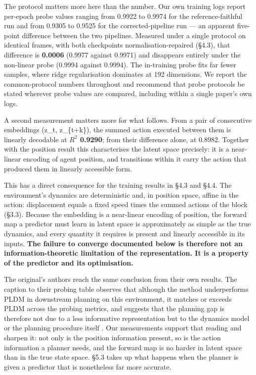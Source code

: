 \documentclass[10pt]{article}
\newcounter{none}
\begin{document}
The protocol matters more here than the number. Our own training logs report
per-epoch probe values ranging from 0.9922 to 0.9974 for the reference-faithful
run and from 0.9305 to 0.9525 for the corrected-pipeline run --- an apparent
five-point difference between the two pipelines. Measured under a single
protocol on identical frames, with both checkpoints normalisation-repaired
(\S{}4.3), that difference is \textbf{0.0006} (0.9977 against 0.9971) and disappears
entirely under the non-linear probe (0.9994 against 0.9994). The in-training
probe fits far fewer samples, where ridge regularisation dominates at 192
dimensions. We report the common-protocol numbers throughout and recommend that
probe protocols be stated wherever probe values are compared, including within a
single paper's own logs.

A second measurement matters more for what follows. From a pair of consecutive
embeddings (z\_t, z\_\{t+k\}), the summed action executed between them is linearly
decodable at \textbf{$R^{2}$ 0.9290}; from their difference alone, at 0.8982. Together
with the position result this characterises the latent space precisely: it is a
near-linear encoding of agent position, and transitions within it carry the
action that produced them in linearly accessible form.

This has a direct consequence for the training results in \S{}4.3 and \S{}4.4. The
environment's dynamics are deterministic and, in position space, affine in the
action: displacement equals a fixed speed times the summed actions of the block
(\S{}3.3). Because the embedding is a near-linear encoding of position, the
forward map a predictor must learn in latent space is approximately as simple as
the true dynamics, and every quantity it requires is present and linearly
accessible in its inputs. \textbf{The failure to converge documented below is
therefore not an information-theoretic limitation of the representation. It is a
property of the predictor and its optimisation.}

The original's authors reach the same conclusion from their own results. The
caption to their probing table observes that although the method underperforms
PLDM in downstream planning on this environment, it matches or exceeds PLDM
across the probing metrics, and suggests that the planning gap is therefore not
due to a less informative representation but to the dynamics model or the
planning procedure itself \citep[Tab.~3 caption]{maes2026lewm}. Our measurements support that reading and
sharpen it: not only is the position information present, so is the action
information a planner needs, and the forward map is no harder in latent space
than in the true state space. \S{}5.3 takes up what happens when the planner is
given a predictor that is nonetheless far more accurate.
\end{document}
